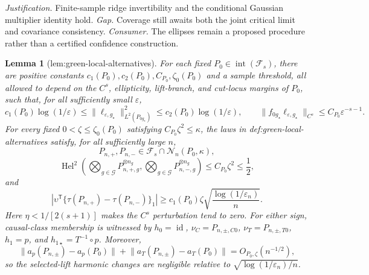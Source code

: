 \documentclass{article}
\newtheorem{lemma}{Lemma}
\begin{document}
\par\smallskip\noindent \textit{Justification.} Finite-sample ridge invertibility and the conditional Gaussian multiplier identity hold. \textit{Gap.} Coverage still awaits both the joint critical limit and covariance consistency. \textit{Consumer.} The ellipses remain a proposed procedure rather than a certified confidence construction.

\begin{lemma}[lem:green-local-alternatives]\label{lem:green-local-alternatives}
For each fixed \(P_0\in\operatorname{int}(\mathcal F_s)\), there are positive constants \(c_1(P_0),c_2(P_0),C_{P_0},\zeta_0(P_0)\) and a sample threshold, all allowed to depend on the \(C^s\), ellipticity, lift-branch, and cut-locus margins of \(P_0\), such that, for all sufficiently small \(\varepsilon\),
\[
c_1(P_0)\log(1/\varepsilon)
\leq \lVert\ell_{\varepsilon,g_\star}\rVert_{L^2(P_{0g_\star})}^2
\leq c_2(P_0)\log(1/\varepsilon),
\qquad
\lVert f_{0g_\star}\ell_{\varepsilon,g_\star}\rVert_{C^s}
\leq C_{P_0}\varepsilon^{-s-1}.
\]
For every fixed \(0<\zeta\leq\zeta_0(P_0)\) satisfying \(C_{P_0}\zeta^2\leq\kappa\), the laws in def:green-local-alternatives satisfy, for all sufficiently large \(n\),
\[
P_{n,+},P_{n,-}\in\mathcal F_s\cap\mathcal N_n(P_0,\kappa),
\]
\[
\operatorname{Hel}^2\!\left(
\bigotimes_{g\in\mathcal G}P_{n,+,g}^{\otimes n_g},
\bigotimes_{g\in\mathcal G}P_{n,-,g}^{\otimes n_g}
\right)
\leq C_{P_0}\zeta^2\leq\frac12,
\]
and
\[
\left|\upsilon^{\mathsf T}\{\tau(P_{n,+})-\tau(P_{n,-})\}_1\right|
\geq c_1(P_0)\zeta\sqrt{\frac{\log(1/\varepsilon_n)}{n}}.
\]
Here \(\eta<1/[2(s+1)]\) makes the \(C^s\) perturbation tend to zero.  For either sign, causal-class membership is witnessed by \(h_0=\operatorname{id}\), \(\nu_C=P_{n,\pm,C0}\), \(\nu_T=P_{n,\pm,T0}\), \(h_1=p\), and \(h_{1\star}=T^{-1}\circ p\).  Moreover,
\[
\lVert a_p(P_{n,\pm})-a_p(P_0)\rVert
+\lVert a_T(P_{n,\pm})-a_T(P_0)\rVert=O_{P_0,\zeta}(n^{-1/2}),
\]
so the selected-lift harmonic changes are negligible relative to \(\sqrt{\log(1/\varepsilon_n)/n}\).
\end{lemma}
\end{document}
